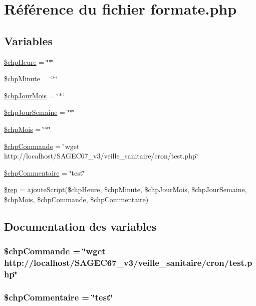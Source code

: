 \hypertarget{formate_8php}{
\section{R\'{e}f\'{e}rence du fichier formate.php}
\label{formate_8php}
}
\subsection*{Variables}
\begin{CompactItemize}
\item 
\hyperlink{formate_8php_a0}{\$chp\-Heure} = \char`\"{}$\ast$\char`\"{}
\item 
\hyperlink{formate_8php_a1}{\$chp\-Minute} = \char`\"{}$\ast$\char`\"{}
\item 
\hyperlink{formate_8php_a2}{\$chp\-Jour\-Mois} = \char`\"{}$\ast$\char`\"{}
\item 
\hyperlink{formate_8php_a3}{\$chp\-Jour\-Semaine} = \char`\"{}$\ast$\char`\"{}
\item 
\hyperlink{formate_8php_a4}{\$chp\-Mois} = \char`\"{}$\ast$\char`\"{}
\item 
\hyperlink{formate_8php_a5}{\$chp\-Commande} = \char`\"{}wget http://localhost/SAGEC67\_\-v3/veille\_\-sanitaire/cron/test.php\char`\"{}
\item 
\hyperlink{formate_8php_a6}{\$chp\-Commentaire} = \char`\"{}test\char`\"{}
\item 
\hyperlink{formate_8php_a7}{\$rep} = ajoute\-Script(\$chp\-Heure, \$chp\-Minute, \$chp\-Jour\-Mois, \$chp\-Jour\-Semaine, \$chp\-Mois, \$chp\-Commande, \$chp\-Commentaire)
\end{CompactItemize}


\subsection{Documentation des variables}
\hypertarget{formate_8php_a5}{
\subsubsection[\$chpCommande]{\setlength{\rightskip}{0pt plus 5cm}\$chp\-Commande = \char`\"{}wget http://localhost/SAGEC67\_\-v3/veille\_\-sanitaire/cron/test.php\char`\"{}}}
\label{formate_8php_a5}


\hypertarget{formate_8php_a6}{
\subsubsection[\$chpCommentaire]{\setlength{\rightskip}{0pt plus 5cm}\$chp\-Commentaire = \char`\"{}test\char`\"{}}}
\label{formate_8php_a6}


